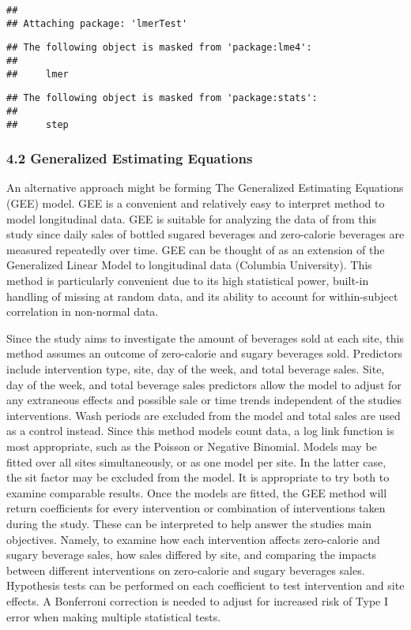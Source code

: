 \documentclass[
]{article}
\begin{document}
\begin{verbatim}
## 
## Attaching package: 'lmerTest'
\end{verbatim}

\begin{verbatim}
## The following object is masked from 'package:lme4':
## 
##     lmer
\end{verbatim}

\begin{verbatim}
## The following object is masked from 'package:stats':
## 
##     step
\end{verbatim}

\hypertarget{generalized-estimating-equations}{%
\subsubsection{4.2 Generalized Estimating
Equations}\label{generalized-estimating-equations}}

An alternative approach might be forming The Generalized Estimating
Equations (GEE) model. GEE is a convenient and relatively easy to
interpret method to model longitudinal data. GEE is suitable for
analyzing the data of from this study since daily sales of bottled
sugared beverages and zero-calorie beverages are measured repeatedly
over time. GEE can be thought of as an extension of the Generalized
Linear Model to longitudinal data (Columbia University). This method is
particularly convenient due to its high statistical power, built-in
handling of missing at random data, and its ability to account for
within-subject correlation in non-normal data.

Since the study aims to investigate the amount of beverages sold at each
site, this method assumes an outcome of zero-calorie and sugary
beverages sold. Predictors include intervention type, site, day of the
week, and total beverage sales. Site, day of the week, and total
beverage sales predictors allow the model to adjust for any extraneous
effects and possible sale or time trends independent of the studies
interventions. Wash periods are excluded from the model and total sales
are used as a control instead. Since this method models count data, a
log link function is most appropriate, such as the Poisson or Negative
Binomial. Models may be fitted over all sites simultaneously, or as one
model per site. In the latter case, the sit factor may be excluded from
the model. It is appropriate to try both to examine comparable results.
Once the models are fitted, the GEE method will return coefficients for
every intervention or combination of interventions taken during the
study. These can be interpreted to help answer the studies main
objectives. Namely, to examine how each intervention affects
zero-calorie and sugary beverage sales, how sales differed by site, and
comparing the impacts between different interventions on zero-calorie
and sugary beverages sales. Hypothesis tests can be performed on each
coefficient to test intervention and site effects. A Bonferroni
correction is needed to adjust for increased risk of Type I error when
making multiple statistical tests.
\end{document}
